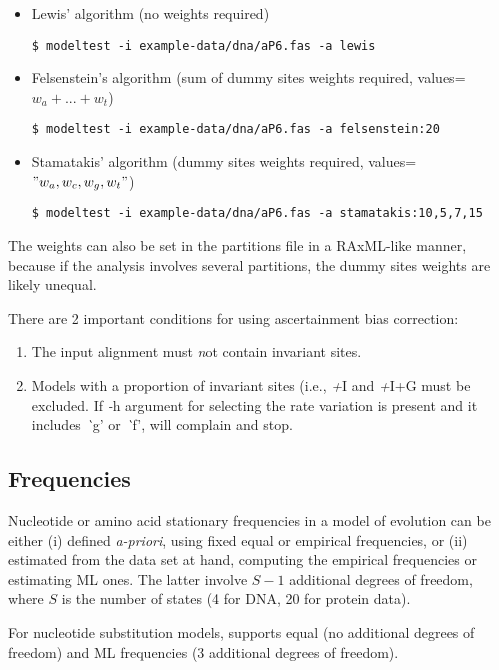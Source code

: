\begin{itemize}
  \item Lewis' algorithm (no weights required)

  \texttt{\$ modeltest -i example-data/dna/aP6.fas -a lewis}

  \item Felsenstein's algorithm (sum of dummy sites weights required, values=${w_a + ... + w_t}$)

  \texttt{\$ modeltest -i example-data/dna/aP6.fas -a felsenstein:20}

  \item Stamatakis' algorithm (dummy sites weights required, values=$"w_a,w_c,w_g,w_t"$)

  \texttt{\$ modeltest -i example-data/dna/aP6.fas -a stamatakis:10,5,7,15}
\end{itemize}

The weights can also be set in the partitions file in a RAxML-like manner,
because if the analysis involves several partitions, the dummy sites weights are likely unequal.

There are 2 important conditions for using ascertainment bias correction:

\begin{enumerate}
\item The input alignment must {\emph not} contain invariant sites.
\item Models with a proportion of invariant sites (i.e., {\emph +I} and {\emph +I+G} must be excluded.
      If {\emph -h} argument for selecting the rate variation is present and it includes {\emph `g'} or {\emph `f'}, {\modeltest} will complain and stop.
\end{enumerate}

\subsection{Frequencies}
\label{sec:arg:freqs}

Nucleotide or amino acid stationary frequencies in a model of evolution can be either (i) defined {\em a-priori},
using fixed equal or empirical frequencies, or (ii) estimated from the data set at hand,
computing the empirical frequencies or estimating ML ones.
The latter involve $S-1$ additional degrees of freedom, where $S$ is the number of states (4 for DNA, 20 for protein data).

For nucleotide substitution models, \modeltest supports equal (no additional degrees of freedom) and ML frequencies (3 additional degrees of freedom).

